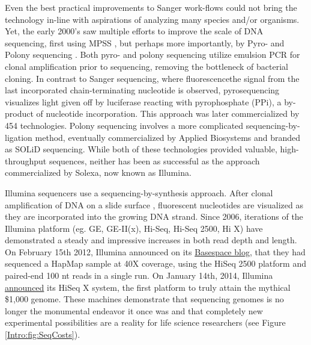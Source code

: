     Even the best practical improvements to Sanger work-flows could not bring the technology in-line with aspirations of analyzing many species and/or organisms. Yet, the early 2000's saw multiple efforts to improve the scale of DNA sequencing, first using MPSS \citep{Brenner2000a}, but perhaps more importantly, by Pyro- \citep{Ronaghi1998a} and Polony sequencing \citep{Shendure2005}. Both pyro- and polony sequencing utilize emulsion PCR \citep{Nakano2003a} for clonal amplification prior to sequencing, removing the bottleneck of bacterial cloning. In contrast to Sanger sequencing, where fluorescencethe signal from the last incorporated chain-terminating nucleotide is observed, pyrosequencing visualizes light given off by luciferase reacting with pyrophosphate (PPi), a by-product of nucleotide incorporation. This approach was later commercialized by 454 technologies. Polony sequencing involves a more complicated sequencing-by-ligation method, eventually commercialized by Applied Biosystems and branded as SOLiD sequencing. While both of these technologies provided valuable, high-throughput sequences, neither has been as successful as the approach commercialized by Solexa, now known as Illumina.

    Illumina sequencers use a sequencing-by-synthesis approach. After clonal amplification of DNA on a slide surface \citep{Bentley2008}, fluorescent nucleotides are visualized as they are incorporated into the growing DNA strand. Since 2006, iterations of the Illumina platform (eg. GE, GE-II(x), Hi-Seq, Hi-Seq 2500, Hi X) have demonstrated a steady and impressive increases in both read depth and length. On February 15th 2012, Illumina announced on its \href{http://blog.basespace.illumina.com/}{Basespace blog}, that they had sequenced a HapMap sample at 40X coverage, using the HiSeq 2500 platform and paired-end 100 nt reads in a single run. On January 14th, 2014, Illumina \href{http://bit.ly/PZpegZ}{announced} its HiSeq X system, the first platform to truly attain the mythical \$1,000 genome. These machines demonstrate that sequencing genomes is no longer the monumental endeavor it once was and that completely new experimental possibilities are a reality for life science researchers (see Figure \ref{Intro:fig:SeqCosts}).

